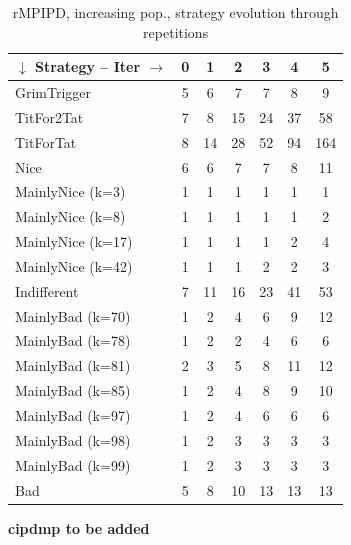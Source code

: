 \documentclass[journal,a4paper,10pt,twoside]{IEEEtran} %
\begin{document}
\begin{table}[ht]
	\caption{rMPIPD, increasing pop., strategy evolution through repetitions}
	\label{tab:ripdmp-incr}
	\centering
	\begin{tabular}{l|cccccc} \toprule
		$\downarrow$ Strategy -- Iter $\rightarrow$ & 0 &  1 &  2 &  3 &  4 &   5 \\ \midrule
		GrimTrigger       & 5 &  6 &  7 &  7 &  8 &   9 \\
		TitFor2Tat        & 7 &  8 & 15 & 24 & 37 &  58 \\
		TitForTat         & 8 & 14 & 28 & 52 & 94 & 164 \\
		Nice              & 6 &  6 &  7 &  7 &  8 &  11 \\
		MainlyNice (k=3)  & 1 &  1 &  1 &  1 &  1 &   1 \\
		MainlyNice (k=8)  & 1 &  1 &  1 &  1 &  1 &   2 \\
		MainlyNice (k=17) & 1 &  1 &  1 &  1 &  2 &   4 \\
		MainlyNice (k=42) & 1 &  1 &  1 &  2 &  2 &   3 \\
		Indifferent       & 7 & 11 & 16 & 23 & 41 &  53 \\
		MainlyBad (k=70)  & 1 &  2 &  4 &  6 &  9 &  12 \\
		MainlyBad (k=78)  & 1 &  2 &  2 &  4 &  6 &   6 \\
		MainlyBad (k=81)  & 2 &  3 &  5 &  8 & 11 &  12 \\
		MainlyBad (k=85)  & 1 &  2 &  4 &  8 &  9 &  10 \\
		MainlyBad (k=97)  & 1 &  2 &  4 &  6 &  6 &   6 \\
		MainlyBad (k=98)  & 1 &  2 &  3 &  3 &  3 &   3 \\
		MainlyBad (k=99)  & 1 &  2 &  3 &  3 &  3 &   3 \\
		Bad               & 5 &  8 & 10 & 13 & 13 &  13 \\ \bottomrule
	\end{tabular}
\end{table}

\textbf{cipdmp to be added}
\end{document}
